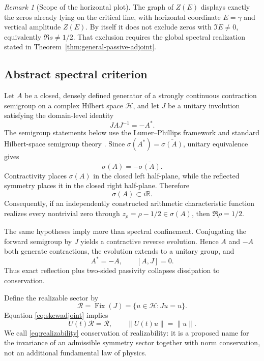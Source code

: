 \documentclass[11pt]{amsart}
\theoremstyle{definition}
\theoremstyle{remark}
\newtheorem{remark}[theorem]{Remark}
\begin{document}
\begin{remark}[Scope of the horizontal plot]\label{rem:hardy-scope}
The graph of $Z(E)$ displays exactly the zeros already lying on the critical line, with
horizontal coordinate $E=\gamma$ and vertical amplitude $Z(E)$.  By itself it does not
exclude zeros with $\Im E\ne0$, equivalently $\Re s\ne1/2$.  That exclusion requires the
global spectral realization stated in Theorem~\ref{thm:general-passive-adjoint}.
\end{remark}

\subsection{Abstract spectral criterion}
Let $A$ be a closed, densely defined generator of a strongly continuous contraction semigroup
on a complex Hilbert space $\mathcal H$, and let $J$ be a unitary involution satisfying the
domain-level identity
\begin{equation}\label{eq:JAJ}
 JAJ^{-1}=-A^*.
\end{equation}
The semigroup statements below use the Lumer--Phillips framework and standard Hilbert-space
semigroup theory \cite{LumerPhillips,EngelNagel}.
Since $\sigma(A^*)=\overline{\sigma(A)}$, unitary equivalence gives
\begin{equation}
 \sigma(A)=-\overline{\sigma(A)}.
\end{equation}
Contractivity places $\sigma(A)$ in the closed left half-plane, while the reflected symmetry
places it in the closed right half-plane.  Therefore
\begin{equation}\label{eq:imaginaryspectrum}
 \sigma(A)\subset i\mathbb R.
\end{equation}
Consequently, if an independently constructed arithmetic characteristic function realizes
every nontrivial zero through $z_\rho=\rho-1/2\in\sigma(A)$, then
$\Re\rho=1/2$.

The same hypotheses imply more than spectral confinement.  Conjugating the forward
semigroup by $J$ yields a contractive reverse evolution.  Hence $A$ and $-A$ both generate
contractions, the evolution extends to a unitary group, and
\begin{equation}\label{eq:skewadjoint}
 A^*=-A,
 \qquad [A,J]=0.
\end{equation}
Thus exact reflection plus two-sided passivity collapses dissipation to conservation.

Define the realizable sector by
\begin{equation}
 \mathcal R=\operatorname{Fix}(J)=\{u\in\mathcal H:Ju=u\}.
\end{equation}
Equation \eqref{eq:skewadjoint} implies
\begin{equation}\label{eq:realizability}
 U(t)\mathcal R=\mathcal R,
 \qquad
 \|U(t)u\|=\|u\|.
\end{equation}
We call \eqref{eq:realizability} conservation of realizability: it is a proposed name for the
invariance of an admissible symmetry sector together with norm conservation, not an additional
fundamental law of physics.
\end{document}
